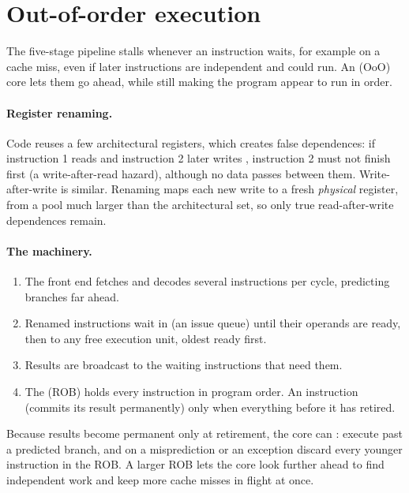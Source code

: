 \section{Out-of-order execution}
\label{sec:ooo}

The five-stage pipeline stalls whenever an instruction waits, for example on a cache miss, even if later instructions are independent and could run. An  (OoO) core lets them go ahead, while still making the program appear to run in order.

\paragraph{Register renaming.} Code reuses a few architectural registers, which creates false dependences: if instruction 1 reads  and instruction 2 later writes , instruction 2 must not finish first (a write-after-read hazard), although no data passes between them. Write-after-write is similar. Renaming maps each new write to a fresh \emph{physical} register, from a pool much larger than the architectural set, so only true read-after-write dependences remain.

\paragraph{The machinery.}
\begin{enumerate}
  \item The front end fetches and decodes several instructions per cycle, predicting branches far ahead.
  \item Renamed instructions wait in  (an issue queue) until their operands are ready, then  to any free execution unit, oldest ready first.
  \item Results are broadcast to the waiting instructions that need them.
  \item The  (ROB) holds every instruction in program order. An instruction  (commits its result permanently) only when everything before it has retired.
\end{enumerate}
Because results become permanent only at retirement, the core can : execute past a predicted branch, and on a misprediction or an exception discard every younger instruction in the ROB. A larger ROB lets the core look further ahead to find independent work and keep more cache misses in flight at once.

